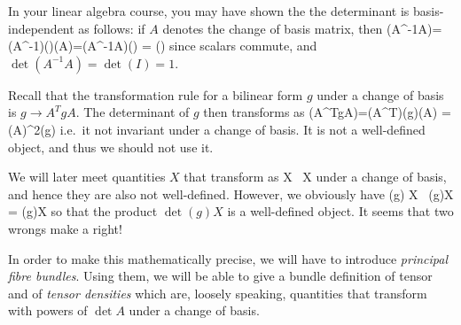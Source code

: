 \br
In your linear algebra course, you may have shown the the determinant is basis-independent as follows: if $A$ denotes the change of basis matrix, then
\bse
\det(A^{-1}\phi A)=\det(A^{-1})\det(\phi)\det(A)=\det(A^{-1}A)\det(\phi) = \det(\phi)
\ese
since scalars commute, and $\det(A^{-1}A)=\det(I)=1$.

Recall that the transformation rule for a bilinear form $g$ under a change of basis is $g \to A^TgA$. The determinant of $g$ then transforms as
\bse
\det(A^TgA)=\det(A^T)\det(g)\det(A) = (\det A)^2\det(g)
\ese
i.e.\ it not invariant under a change of basis. It is not a well-defined object, and thus we should not use it. 

We will later meet quantities $X$ that transform as
\bse
X \to {} \, X
\ese
under a change of basis, and hence they are also not well-defined. However, we obviously have
\bse
\det(g) X \to {} \, \det(g)X = \det(g)X
\ese
so that the product $\det(g)X$ is a well-defined object. It seems that two wrongs make a right!

In order to make this mathematically precise, we will have to introduce \emph{principal fibre bundles}. Using them, we will be able to give a bundle definition of tensor and of \emph{tensor densities} which are, loosely speaking, quantities that transform with powers of $\det A$ under a change of basis.
\er
































